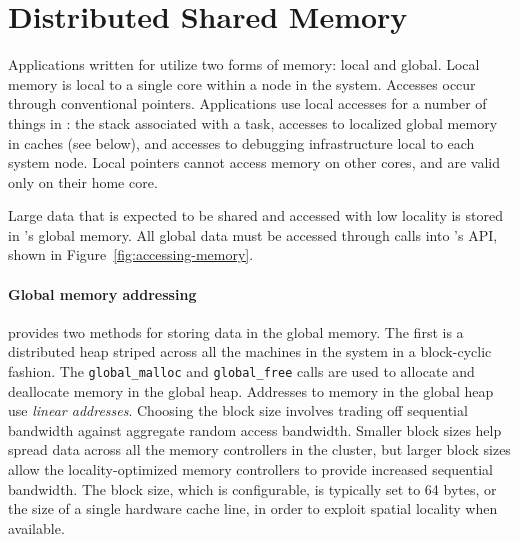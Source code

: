 \section{Distributed Shared Memory}
\label{sec:memory}

Applications written for \Grappa utilize two forms of memory: local and
global. Local memory is local to a single core within a node in the system.
Accesses occur through conventional pointers. Applications use local accesses for a
number of things in \Grappa: the stack associated with a task, accesses to
localized global memory in caches (see below), and accesses to debugging
infrastructure local to each system node. Local pointers cannot access
memory on other cores, and are valid only on their home core.

Large data that is expected to be shared and accessed with low locality is
stored in \Grappa's global memory. All global data must be accessed through
calls into \Grappa's API, shown in Figure~\ref{fig:accessing-memory}. 


\paragraph{Global memory addressing} \Grappa provides two methods for storing
data in the global memory. The first is a distributed heap striped across all
the machines in the system in a block-cyclic fashion. The
\texttt{global\_malloc} and \texttt{global\_free} calls are used to allocate
and deallocate memory in the global heap. Addresses to memory in the global
heap use \emph{linear addresses}. Choosing the block size involves trading off
sequential bandwidth against aggregate random access bandwidth. Smaller block
sizes help spread data across all the memory controllers in the cluster, but
larger block sizes allow the locality-optimized memory controllers to provide
increased sequential bandwidth. The block size, which is configurable, is
typically set to 64 bytes, or the size of a single hardware cache line, in
order to exploit spatial locality when available.

